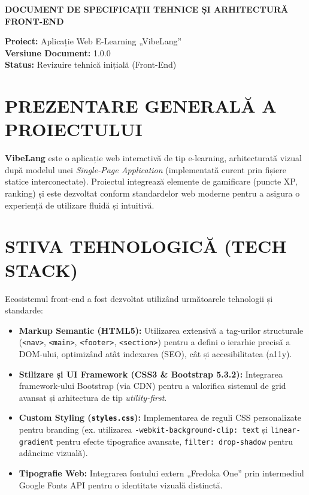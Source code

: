 \documentclass[11pt, a4paper]{article}
\begin{document}
\begin{center}
    \LARGE\textbf{DOCUMENT DE SPECIFICAȚII TEHNICE ȘI ARHITECTURĂ FRONT-END}
\end{center}

\vspace{0.5cm}

\noindent
\textbf{Proiect:} Aplicație Web E-Learning „VibeLang” \\
\textbf{Versiune Document:} 1.0.0 \\
\textbf{Status:} Revizuire tehnică inițială (Front-End)

\vspace{0.8cm}

\section{PREZENTARE GENERALĂ A PROIECTULUI}
\textbf{VibeLang} este o aplicație web interactivă de tip e-learning, arhitecturată vizual după modelul unei \textit{Single-Page Application} (implementată curent prin fișiere statice interconectate). Proiectul integrează elemente de gamificare (puncte XP, ranking) și este dezvoltat conform standardelor web moderne pentru a asigura o experiență de utilizare fluidă și intuitivă.

\section{STIVA TEHNOLOGICĂ (TECH STACK)}
Ecosistemul front-end a fost dezvoltat utilizând următoarele tehnologii și standarde:

\begin{itemize}
    \item \textbf{Markup Semantic (HTML5):} Utilizarea extensivă a tag-urilor structurale (\texttt{<nav>}, \texttt{<main>}, \texttt{<footer>}, \texttt{<section>}) pentru a defini o ierarhie precisă a DOM-ului, optimizând atât indexarea (SEO), cât și accesibilitatea (a11y).
    \item \textbf{Stilizare și UI Framework (CSS3 \& Bootstrap 5.3.2):} Integrarea framework-ului Bootstrap (via CDN) pentru a valorifica sistemul de grid avansat și arhitectura de tip \textit{utility-first}.
    \item \textbf{Custom Styling (\texttt{styles.css}):} Implementarea de reguli CSS personalizate pentru branding (ex. utilizarea \texttt{-webkit-background-clip: text} și \texttt{linear-gradient} pentru efecte tipografice avansate, \texttt{filter: drop-shadow} pentru adâncime vizuală).
    \item \textbf{Tipografie Web:} Integrarea fontului extern „Fredoka One” prin intermediul Google Fonts API pentru o identitate vizuală distinctă.
\end{itemize}
\end{document}

